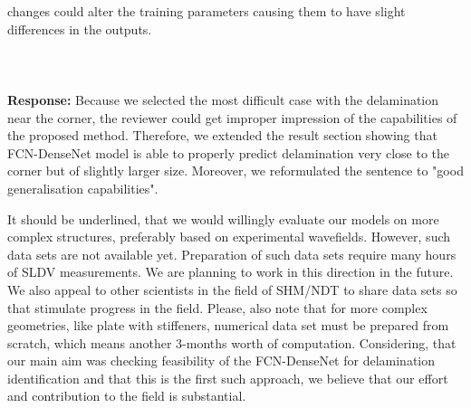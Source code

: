 \documentclass[11pt,a4paper]{article}
\begin{document}
	changes could alter the training parameters causing them to have slight differences in the outputs.
	\\ \\	
	\\ \\ 
	\color{blue}\textbf{Response:} Because we selected the most difficult case with the delamination near the corner, the reviewer could get improper impression of the capabilities of the proposed method. Therefore, we extended the result section showing that FCN-DenseNet model is able to properly predict delamination very close to the corner but of slightly larger size. Moreover, we reformulated the sentence to "good generalisation capabilities". 
	
	It should be underlined, that we would willingly evaluate our models on more complex structures, preferably based on experimental wavefields. However, such data sets are not available yet. Preparation of such data sets require many hours of SLDV measurements. We are planning to work in this direction in the future. We also appeal to other scientists in the field of SHM/NDT to share data sets so that stimulate progress in the field. Please, also note that for more complex geometries, like plate with stiffeners, numerical data set must be prepared from scratch, which means another 3-months worth of computation. Considering, that our main aim was checking feasibility of the FCN-DenseNet for delamination identification and that this is the first such approach, we believe that our effort and contribution to the field is substantial.
	 
	
\end{document}
